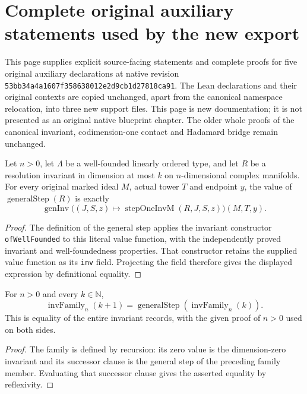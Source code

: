 \section{Complete original auxiliary statements used by the new export}

This page supplies explicit source-facing statements and complete proofs for
five original auxiliary declarations at native revision
\texttt{53bb34a4a1607f358638012e2d9cb1d27818ca91}. The Lean declarations and
their original contexts are copied unchanged, apart from the canonical
namespace relocation, into three new support files. This page is new
documentation; it is not presented as an original native blueprint chapter.
The older whole proofs of the canonical invariant, codimension-one contact
and Hadamard bridge remain unchanged.

\begin{lemma}
\label{pub:canonical-general-step-value}
\notready
Let $n>0$, let $\Lambda$ be a well-founded linearly ordered type, and let $R$
be a resolution invariant in dimension at most $k$ on $n$-dimensional complex
manifolds. For every original marked ideal $M$, actual tower $T$ and endpoint
$y$, the value of $\operatorname{generalStep}(R)$ is exactly
\[
 \operatorname{genInv}\bigl((J,S,z)\mapsto
       \operatorname{stepOneInvM}(R,J,S,z)\bigr)(M,T,y).
\]
\end{lemma}
\begin{proof}
The definition of the general step applies the invariant constructor
\texttt{ofWellFounded} to this literal value function, with the independently
proved invariant and well-foundedness properties. That constructor retains
the supplied value function as its \texttt{inv} field. Projecting the field
therefore gives the displayed expression by definitional equality.
\end{proof}

\begin{lemma}
\label{pub:canonical-invariant-successor}
\notready
For $n>0$ and every $k\in\mathbb N$,
\[
 \operatorname{invFamily}_n(k+1)
   =\operatorname{generalStep}(\operatorname{invFamily}_n(k)).
\]
This is equality of the entire invariant records, with the given proof of
$n>0$ used on both sides.
\end{lemma}
\begin{proof}
The family is defined by recursion: its zero value is the dimension-zero
invariant and its successor clause is the general step of the preceding
family member. Evaluating that successor clause gives the asserted equality
by reflexivity.
\end{proof}

